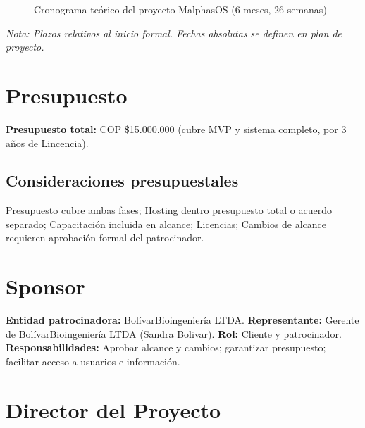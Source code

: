 \documentclass[12pt,a4paper]{article}
\begin{document}
\begin{figure}[H]
{\begin{ganttchart}
\end{ganttchart}%
}
\caption{Cronograma teórico del proyecto MalphasOS (6 meses, 26 semanas)}
\label{fig:cronograma}
\end{figure}

\textit{Nota: Plazos relativos al inicio formal. Fechas absolutas se definen en plan de proyecto.}

\section{Presupuesto}

\textbf{Presupuesto total:} COP \$15.000.000 (cubre MVP y sistema completo, por 3 años de Lincencia).

\subsection{Consideraciones presupuestales}

Presupuesto cubre ambas fases; Hosting dentro presupuesto total o acuerdo separado; Capacitación incluida en alcance; Licencias; Cambios de alcance requieren aprobación formal del patrocinador.

\section{Sponsor}

\vspace{0.3cm}

\textbf{Entidad patrocinadora:} BolívarBioingeniería LTDA. \textbf{Representante:} Gerente de BolívarBioingeniería LTDA (Sandra Bolivar). \textbf{Rol:} Cliente y patrocinador. \textbf{Responsabilidades:} Aprobar alcance y cambios; garantizar presupuesto; facilitar acceso a usuarios e información.

\section{Director del Proyecto}

\vspace{0.3cm}
\end{document}

